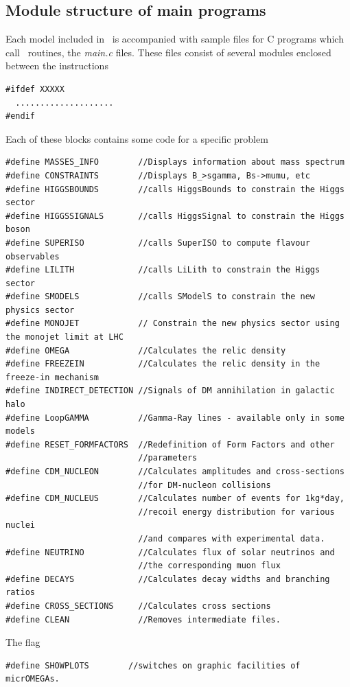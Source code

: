\documentclass[12pt,a4paper]{article}
\begin{document}
\subsection{Module structure of main programs}
Each model included in \micro\  is accompanied with sample files for
C  programs which call \micro\ routines, the {\it main.c}  files.  
These files   consist of
several modules enclosed between the instructions
\begin{verbatim}
#ifdef XXXXX
  ....................
#endif
\end{verbatim}
Each of these blocks  contains some code for a specific problem
{\small
\begin{verbatim}
#define MASSES_INFO        //Displays information about mass spectrum 
#define CONSTRAINTS        //Displays B_>sgamma, Bs->mumu, etc
#define HIGGSBOUNDS        //calls HiggsBounds to constrain the Higgs sector
#define HIGGSSIGNALS       //calls HiggsSignal to constrain the Higgs boson
#define SUPERISO           //calls SuperISO to compute flavour observables
#define LILITH             //calls LiLith to constrain the Higgs sector
#define SMODELS            //calls SModelS to constrain the new physics sector
#define MONOJET            // Constrain the new physics sector using the monojet limit at LHC
#define OMEGA              //Calculates the relic density 
#define FREEZEIN           //Calculates the relic density in the freeze-in mechanism
#define INDIRECT_DETECTION //Signals of DM annihilation in galactic halo
#define LoopGAMMA          //Gamma-Ray lines - available only in some models
#define RESET_FORMFACTORS  //Redefinition of Form Factors and other
                           //parameters 
#define CDM_NUCLEON        //Calculates amplitudes and cross-sections
                           //for DM-nucleon collisions 
#define CDM_NUCLEUS        //Calculates number of events for 1kg*day,
                           //recoil energy distribution for various nuclei
                           //and compares with experimental data.
#define NEUTRINO           //Calculates flux of solar neutrinos and
                           //the corresponding muon flux 
#define DECAYS             //Calculates decay widths and branching ratios  
#define CROSS_SECTIONS     //Calculates cross sections 
#define CLEAN              //Removes intermediate files.
\end{verbatim}

}

The  flag \\[1mm]
\begin{verbatim}
#define SHOWPLOTS        //switches on graphic facilities of micrOMEGAs.
\end{verbatim}
\end{document}
